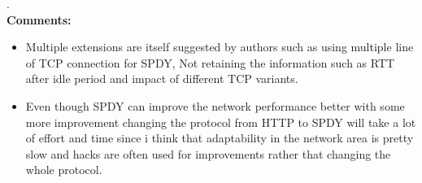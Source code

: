 \documentclass[a4paper,12pt, twoside]{article}
\begin{document}
.\\

\textbf{Comments:}
\begin{itemize}
	\item Multiple extensions are itself suggested by authors such as using multiple line of TCP connection for SPDY, Not retaining the information such as RTT after idle period and impact of different TCP variants.
	\item Even though SPDY can improve the network performance better with some more improvement changing the protocol from HTTP to SPDY will take a lot of effort and time since i think that adaptability in the network area is pretty slow and hacks are often used for improvements rather that changing the whole protocol.  
\end{itemize}
\end{document}
